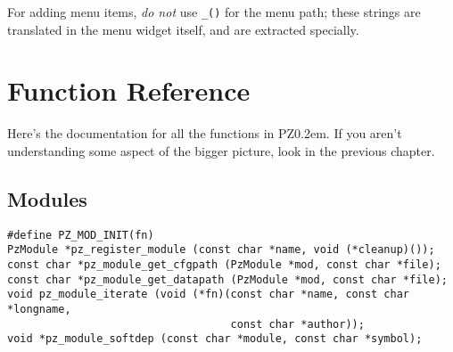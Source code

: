\documentclass[12pt,letterpaper]{report}
\def\pz{{\footnotesize PZ}}
\def\pzt{\pz\kern0.2em{\large\oldstyle2}}
\begin{document}
For adding menu items, {\it do not} use \verb|_()| for the menu path; these strings are
translated in the menu widget itself, and are extracted specially.

\chapter{Function Reference}
Here's the documentation for all the functions in \pzt. If you aren't understanding
some aspect of the bigger picture, look in the previous chapter.

\section{Modules}
\begin{verbatim}
#define PZ_MOD_INIT(fn)
PzModule *pz_register_module (const char *name, void (*cleanup)());
const char *pz_module_get_cfgpath (PzModule *mod, const char *file);
const char *pz_module_get_datapath (PzModule *mod, const char *file);
void pz_module_iterate (void (*fn)(const char *name, const char *longname,
                                   const char *author));
void *pz_module_softdep (const char *module, const char *symbol);
\end{verbatim}
\end{document}
